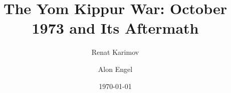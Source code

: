 \title{The Yom Kippur War: October 1973 and Its Aftermath}
\newcommand{\BookTitle}{The Yom Kippur War: October 1973 and Its Aftermath}
\author{Renat Karimov \and Alon Engel}
\date{\today}
